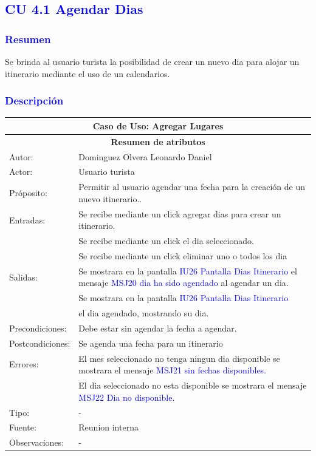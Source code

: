 \subsection{\textcolor{blue}{CU 4.1 Agendar Dias}}

\subsubsection{\textcolor{blue}{Resumen}}
Se brinda al usuario turista la posibilidad de crear un nuevo dia para alojar un itinerario mediante el uso de un calendarios.

\subsubsection{\textcolor{blue}{Descripción}}
\begin{tabularx}{16cm}{||l|X||}
	\hline
	\multicolumn{2}{||c||}{Caso de Uso: Agregar Lugares} \\
	\hline
	\multicolumn{2}{||c||}{\textbf{Resumen de atributos}} \\
	\hline
	{Autor:} & Dominguez Olvera Leonardo Daniel \\
    \hline
	{Actor:} & Usuario turista\\
	\hline
	{Próposito:} & Permitir al usuario agendar una fecha para la creación de un nuevo itinerario..\\
	\hline
	{Entradas:}&Se recibe mediante un click agregar dias para crear un itinerario.\\
  &Se recibe mediante un click el dia seleccionado.\\
  & Se recibe mediante un click eliminar uno o todos los dia \\
	\hline
	{Salidas:} &Se mostrara en la pantalla \textcolor{blue}{IU26 Pantalla Dias Itinerario} el mensaje \textcolor{blue}{MSJ20 dia ha sido agendado} al agendar un dia.  \\
  & Se mostrara en la pantalla \textcolor{blue}{IU26 Pantalla Dias Itinerario}\\
  &el dia agendado, mostrando su dia.\\
	\hline
	{Precondiciones:} & Debe estar sin agendar la fecha a agendar.\\
	\hline
	{Postcondiciones:}  & Se agenda una fecha para un itinerario\\
	\hline
	{Errores:} & El mes seleccionado no tenga ningun dia disponible se mostrara el mensaje \textcolor{blue}{MSJ21 sin fechas disponibles.} \\
 & El dia seleccionado no esta disponible se mostrara el mensaje \textcolor{blue}{MSJ22 Dia no disponible.} \\
  
	\hline
	{Tipo:} & -\\
	\hline
	{Fuente:} & Reunion interna \\
	\hline
	{Observaciones:} & {-} \\
	\hline
\end{tabularx}

